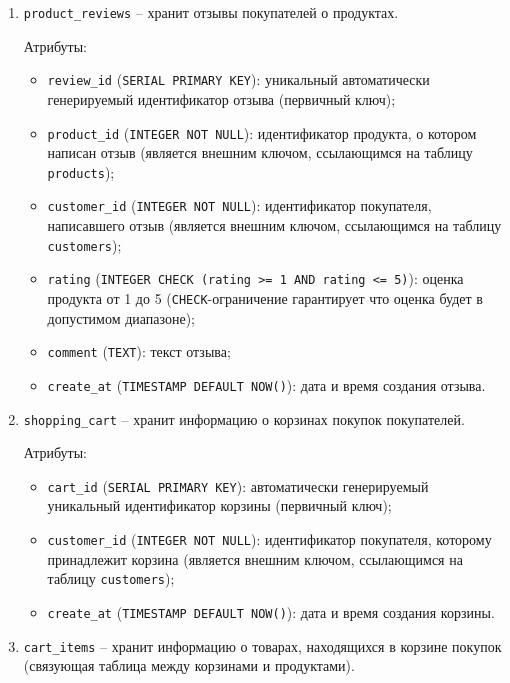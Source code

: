 \documentclass[master,paper]{pmk-graduate}
\begin{document}
\begin{enumerate}
\item \texttt{product\_reviews} -- хранит отзывы покупателей о продуктах.

Атрибуты:
\begin{itemize}
	\item \texttt{review\_id} (\texttt{SERIAL PRIMARY KEY}): уникальный автоматически генерируемый идентификатор отзыва (первичный ключ);
	\item \texttt{product\_id} (\texttt{INTEGER NOT NULL}): идентификатор продукта, о котором написан отзыв (является внешним ключом, ссылающимся на таблицу \texttt{products});
	\item \texttt{customer\_id} (\texttt{INTEGER NOT NULL}): идентификатор покупателя, написавшего отзыв (является внешним ключом, ссылающимся на таблицу \texttt{customers});
	\item \texttt{rating} (\texttt{INTEGER CHECK (rating >= 1 AND rating <= 5)}): оценка продукта от 1 до 5 (\texttt{CHECK}-ограничение гарантирует что оценка будет в допустимом диапазоне);
	\item \texttt{comment} (\texttt{TEXT}): текст отзыва;
	\item \texttt{create\_at} (\texttt{TIMESTAMP DEFAULT NOW()}): дата и время создания отзыва.
\end{itemize}

\item \texttt{shopping\_cart} -- хранит информацию о корзинах покупок покупателей.

Атрибуты:
\begin{itemize}
	\item \texttt{cart\_id} (\texttt{SERIAL PRIMARY KEY}): автоматически генерируемый уникальный идентификатор корзины (первичный ключ);
	\item \texttt{customer\_id} (\texttt{INTEGER NOT NULL}): идентификатор покупателя, которому принадлежит корзина (является внешним ключом, ссылаю\-щимся на таблицу \texttt{customers});
	\item \texttt{create\_at} (\texttt{TIMESTAMP DEFAULT NOW()}): дата и время создания корзины.
\end{itemize}

\item \texttt{cart\_items} -- хранит информацию о товарах, находящихся в корзине покупок (связующая таблица между корзинами и продуктами).


\end{enumerate}
\end{document}
